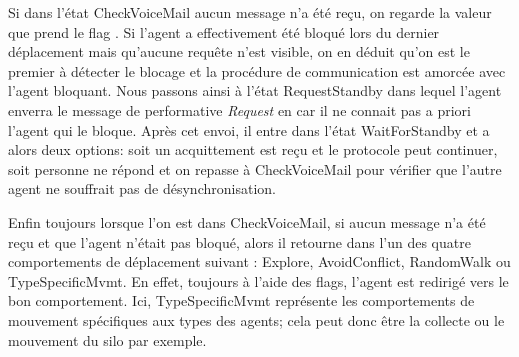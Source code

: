 \documentclass[11pt]{article}
\begin{document}
Si dans l'état \textsf{CheckVoiceMail} aucun message n'a été reçu, on regarde la valeur que prend le flag . Si l'agent a effectivement été bloqué lors du dernier déplacement mais qu'aucune requête n'est visible, on en déduit qu'on est le premier à détecter le blocage et la procédure de communication est amorcée avec l'agent bloquant. Nous passons ainsi à l'état \textsf{RequestStandby} dans lequel l'agent enverra le message de performative \textit{Request} en  car il ne connait pas a priori l'agent qui le bloque. Après cet envoi, il entre dans l'état \textsf{WaitForStandby} et a alors deux options: soit un acquittement est reçu et le protocole peut continuer, soit personne ne répond et on repasse à \textsf{CheckVoiceMail} pour vérifier que l'autre agent ne souffrait pas de désynchronisation.

Enfin toujours lorsque l'on est dans \textsf{CheckVoiceMail}, si aucun message n'a été reçu et que l'agent n'était pas bloqué, alors il retourne dans l'un  des quatre comportements de déplacement suivant : \textsf{Explore}, \textsf{AvoidConflict}, \textsf{RandomWalk} ou \textsf{TypeSpecificMvmt}. En effet, toujours à l'aide des flags, l'agent est redirigé vers le bon comportement. Ici, \textsf{TypeSpecificMvmt} représente les comportements de mouvement spécifiques aux types des agents; cela peut donc être la collecte ou le mouvement du silo par exemple.
\end{document}
